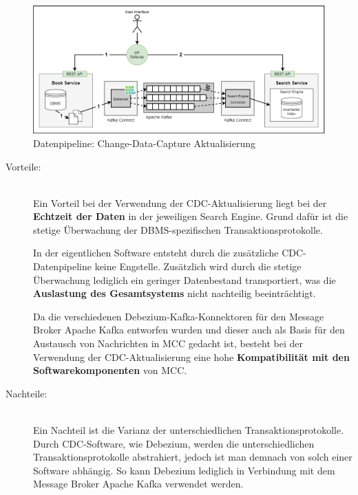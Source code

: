 \begin{figure}[H]
    \centering
    \includegraphics[width=0.9\linewidth]{images/CDC_aktualisierung.png}
    \caption{Datenpipeline: Change-Data-Capture Aktualisierung}
    \label{fig:changedatacapture_aktualisierung}
\end{figure}

\begin{description}
    \item[Vorteile:]\hfill \\
    Ein Vorteil bei der Verwendung der CDC-Aktualisierung liegt bei der \textbf{Echtzeit der Daten} in der jeweiligen Search Engine. Grund dafür ist die stetige Überwachung der DBMS-spezifischen Transaktionsprotokolle.

    In der eigentlichen Software entsteht durch die zusätzliche CDC-Datenpipeline keine Engstelle. Zusätzlich wird durch die stetige Überwachung lediglich ein geringer Datenbestand transportiert, was die \textbf{Auslastung des Gesamtsystems} nicht nachteilig beeinträchtigt.

    Da die verschiedenen Debezium-Kafka-Konnektoren für den Message Broker \glqq Apache Kafka\grqq{} entworfen wurden und dieser auch als Basis für den Austausch von Nachrichten in MCC gedacht ist, besteht bei der Verwendung der CDC-Aktualisierung eine hohe \textbf{Kompatibilität mit den Softwarekomponenten} von MCC.
    
    \item[Nachteile:]\hfill \\
    Ein Nachteil ist die Varianz der unterschiedlichen Transaktionsprotokolle. Durch CDC-Software, wie \glqq Debezium\grqq{}, werden die unterschiedlichen Transaktionsprotokolle abstrahiert, jedoch ist man demnach von solch einer Software abhängig. So kann Debezium lediglich in Verbindung mit dem Message Broker \glqq Apache Kafka\grqq{} verwendet werden.

\end{description}

